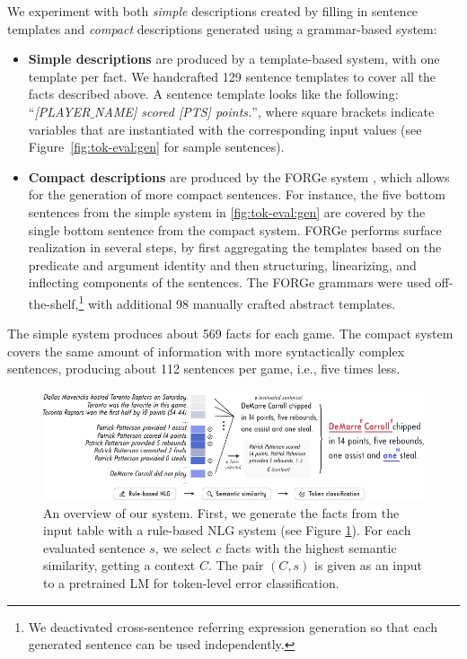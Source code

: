 We experiment with both \emph{simple} descriptions created by filling in sentence templates and \emph{compact} descriptions generated using a grammar-based system:
\begin{itemize}
    \item \textbf{Simple descriptions} are produced by a template-based system, with one template per fact. We handcrafted 129 sentence templates to cover all the facts described above. A sentence template looks like the following: ``\textit{[PLAYER$\_$NAME] scored [PTS] points.}'', where square brackets indicate variables that are instantiated with the corresponding input values (see Figure~\ref{fig:tok-eval:gen} for sample sentences).
    \item  \textbf{Compact descriptions} are produced by the FORGe system \cite{mille2019teaching}, which allows for the generation of more compact sentences.  For instance, the five bottom sentences from the simple system in \autoref{fig:tok-eval:gen} are covered by the single bottom sentence from the compact system. FORGe performs surface realization in several steps, by first aggregating the templates based on the predicate and argument identity and then structuring, linearizing, and inflecting components of the sentences. The FORGe grammars were used off-the-shelf,\footnote{We deactivated cross-sentence referring expression generation so that each generated sentence can be used independently.} with additional 98 manually crafted abstract templates.
\end{itemize}

The simple system produces about 569 facts for each game. The compact system covers the same amount of information with more syntactically complex sentences, producing about 112 sentences per game, i.e., five times less.


\begin{figure}[t]
    \centering
    \includegraphics[width=\textwidth]{img/tok-eval_system.pdf}
    \caption[Our system for token-level error annotation.]{An overview of our system. First, we generate the facts from the input table with a rule-based NLG system (see Figure \ref{fig:tok-eval:system}). For each evaluated sentence $s$, we select $c$ facts with the highest semantic similarity, getting a context $C$. The pair $(C, s)$ is given as an input to a pretrained LM for token-level error classification.}
    \label{fig:tok-eval:system}
\end{figure}

